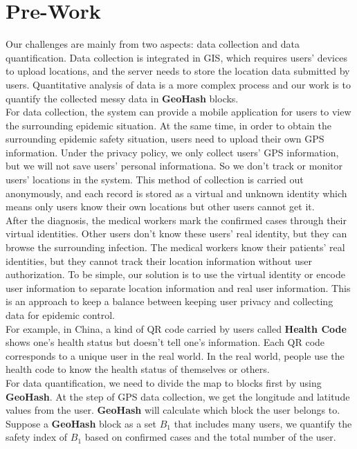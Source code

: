 \documentclass[sigplan,screen]{acmart}
\begin{document}
\section{Pre-Work}
Our challenges are mainly from two aspects: data collection and data quantification.
Data collection is integrated in GIS, which requires users' devices to upload locations, and the server needs to store the location data submitted by users.
Quantitative analysis of data is a more complex process and our work is to quantify the collected messy data in \textbf{GeoHash} blocks.
\\
For data collection, the system can provide a mobile application for users to view the surrounding epidemic situation.
At the same time, in order to obtain the surrounding epidemic safety situation, users need to upload their own GPS information.
Under the privacy policy, we only collect users' GPS information, but we will not save users' personal informationa. So we don't track or monitor users' locations in the system.
This method of collection is carried out anonymously, and each record is stored as a virtual and unknown identity which means only users know their own locations but other users cannot get it.
\\
After the diagnosis, the medical workers mark the confirmed cases through their virtual identities.
Other users don't know these users' real identity, but they can browse the surrounding infection.
The medical workers know their patients' real identities, but they cannot track their location information without user authorization.
To be simple, our solution is to use the virtual identity or encode user information to separate location information and real user information.
This is an approach to keep a balance between keeping user privacy and collecting data for epidemic control.
\\
For example, in China, a kind of QR code carried by users called \textbf{Health Code} shows one's health status but doesn't tell one's information.
Each QR code corresponds to a unique user in the real world.
In the real world, people use the health code to know the health status of themselves or others.
\\
For data quantification, we need to divide the map to blocks first by using \textbf{GeoHash}.
At the step of GPS data collection, we get the longitude and latitude values from the user.
\textbf{GeoHash} will calculate which block the user belongs to.
Suppose a \textbf{GeoHash} block as a set $B_1$ that includes many users, we quantify the safety index of $B_1$ based on confirmed cases and the total number of the user.
\end{document}

